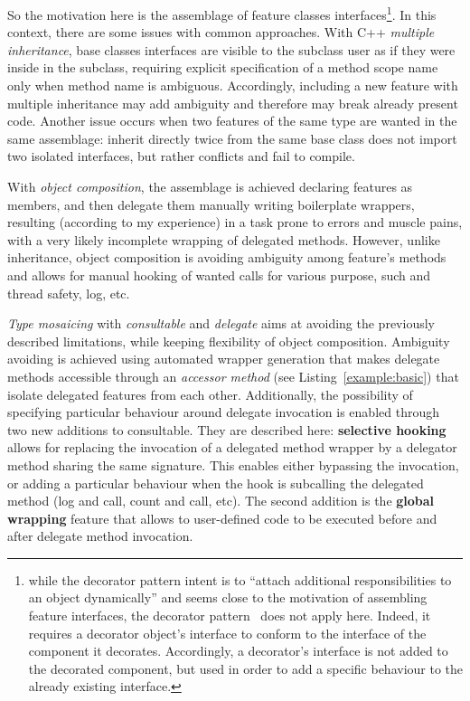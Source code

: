 \documentclass{article}
\begin{document}
So the motivation here is the assemblage of feature classes interfaces\footnote{while the decorator pattern intent is to ``attach additional responsibilities to an object dynamically'' and seems close to the motivation of assembling feature interfaces, the decorator pattern~\cite{1995gamma} does not apply here. Indeed, it requires a decorator object's interface to conform to the interface of the component it decorates. Accordingly, a decorator's interface is not added to the decorated component, but used in order to add a specific behaviour to the already existing interface.}. In this context, there are some issues with common approaches. With C++ \textit{multiple inheritance}, base classes interfaces are visible to the subclass user as if they were inside in the subclass, requiring explicit specification of a method scope name only when method name is ambiguous. Accordingly, including a new feature with multiple inheritance may add ambiguity and therefore may break already present code. Another issue occurs when two features of the same type are wanted in the same assemblage: inherit directly twice from the same base class does not import two isolated interfaces, but rather conflicts and fail to compile.

With \textit{object composition}, the assemblage is achieved declaring features as members, and then delegate them manually writing boilerplate wrappers, resulting (according to my experience) in a task prone to errors and muscle pains, with a very likely incomplete wrapping of delegated methods. However, unlike inheritance, object composition is avoiding ambiguity among feature's methods and allows for manual hooking of wanted calls for various purpose, such and thread safety, log, etc.  

\textit{Type mosaicing} with \textit{consultable} and \textit{delegate} aims at avoiding the previously described limitations, while keeping flexibility of object composition. Ambiguity avoiding is achieved using automated wrapper generation that makes delegate methods accessible through an \textit{accessor method} (see Listing~\ref{example:basic}) that isolate delegated features from each other. Additionally, the possibility of specifying particular behaviour around delegate invocation is enabled through two new additions to consultable. They are described here: \textbf{selective hooking} allows for replacing the invocation of a delegated method wrapper by a delegator method sharing the same signature. This enables either bypassing the invocation, or adding a particular behaviour when the hook is subcalling the delegated method (log and call, count and call, etc). The second addition is the \textbf{global wrapping} feature that allows to user-defined code to be executed before and after delegate method invocation.     
\end{document}

